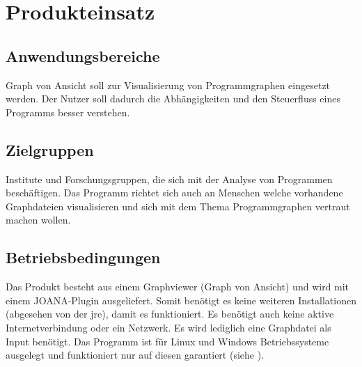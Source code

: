 \chapter{Produkteinsatz}

\section{Anwendungsbereiche}
Graph von Ansicht soll zur Visualisierung von Programmgraphen eingesetzt werden. Der Nutzer soll dadurch die Abhängigkeiten und den Steuerfluss eines Programms besser verstehen.
\section{Zielgruppen}
Institute und Forschungsgruppen, die sich mit der Analyse von Programmen beschäftigen. Das Programm richtet sich auch an Menschen welche vorhandene Graphdateien visualisieren und sich mit dem Thema Programmgraphen vertraut machen wollen.

\section{Betriebsbedingungen}
Das Produkt besteht aus einem Graphviewer (Graph von Ansicht) und wird mit einem JOANA-Plugin ausgeliefert. Somit benötigt es keine weiteren Installationen (abgesehen von der \gls{jre}), damit es funktioniert. Es benötigt auch keine aktive Internetverbindung oder ein Netzwerk. Es wird lediglich eine Graphdatei als Input benötigt. Das Programm ist für Linux und Windows Betriebssysteme ausgelegt und funktioniert nur auf diesen garantiert (siehe ).